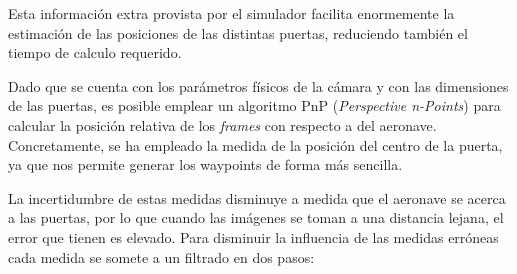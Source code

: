 Esta información extra provista por el simulador facilita enormemente la estimación de las posiciones de las distintas puertas, reduciendo también el tiempo de calculo requerido.



Dado que se cuenta con los parámetros físicos de la cámara y con las dimensiones de las puertas, es posible emplear un algoritmo PnP (\textit{Perspective n-Points}) para calcular la posición relativa de los \textit{frames} con respecto a del aeronave. Concretamente, se ha empleado la medida de la posición del centro de la puerta, ya que nos permite generar los waypoints de forma más sencilla.






La incertidumbre de estas medidas disminuye a medida que el aeronave se acerca a las puertas, por lo que cuando las imágenes se toman a una distancia lejana, el error que tienen es elevado. Para disminuir la influencia de las medidas erróneas cada medida se somete a un filtrado en dos pasos:

